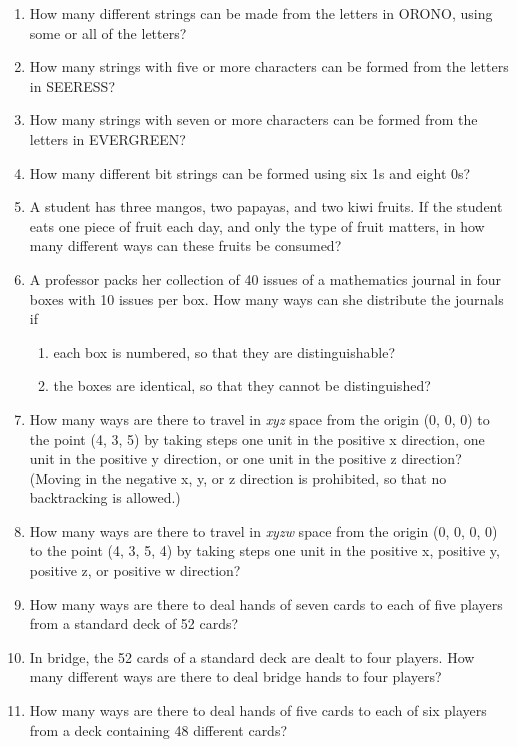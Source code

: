 \documentclass[11pt,a4paper]{book}
\begin{document}
\begin{enumerate}
\item How many different strings can be made from the letters in ORONO, using some or all of the letters?
\item How many strings with five or more characters can be formed from the letters in SEERESS?
\item How many strings with seven or more characters can be formed from the letters in EVERGREEN?
\item How many different bit strings can be formed using six 1s and eight 0s?
\item A student has three mangos, two papayas, and two kiwi fruits.
If the student eats one piece of fruit each day, and only the type of fruit matters, in how many different ways can these fruits be consumed?
\item A professor packs her collection of 40 issues of a mathematics journal in four boxes with 10 issues per box.
How many ways can she distribute the journals if
\begin{enumerate}[label=(\alph*)]
\item each box is numbered, so that they are distinguishable?
\item the boxes are identical, so that they cannot be distinguished?
\end{enumerate}
\item How many ways are there to travel in \emph{xyz} space from the origin (0, 0, 0) to the point (4, 3, 5) by taking steps one unit in the positive x direction, one unit in the positive y direction, or one unit in the positive z direction? (Moving in the negative x, y, or z direction is prohibited, so that no backtracking is allowed.)
\item How many ways are there to travel in \emph{xyzw} space from the origin (0, 0, 0, 0) to the point (4, 3, 5, 4) by taking steps one unit in the positive x, positive y, positive z, or positive w direction?
\item How many ways are there to deal hands of seven cards to each of five players from a standard deck of 52 cards?
\item In bridge, the 52 cards of a standard deck are dealt to four players.
How many different ways are there to deal bridge hands to four players?
\item How many ways are there to deal hands of five cards to each of six players from a deck containing 48 different cards?

\end{enumerate}
\end{document}
